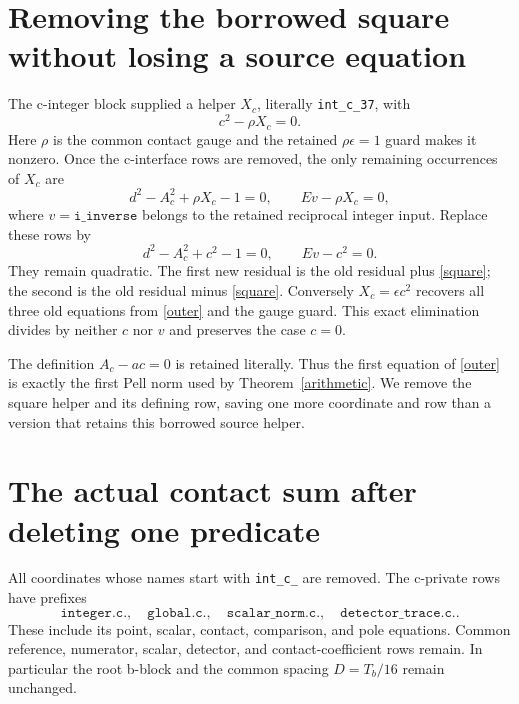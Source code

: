 \documentclass[11pt]{article}
\begin{document}
\section{Removing the borrowed square without losing a source equation}

The c-integer block supplied a helper $X_c$, literally
\texttt{int\_c\_37}, with
\begin{equation}\label{square}
                             c^2-\rho X_c=0.
\end{equation}
Here $\rho$ is the common contact gauge and the retained
$\rho\epsilon=1$ guard makes it nonzero. Once the c-interface
rows are removed, the only remaining occurrences of $X_c$ are
\[
 d^2-A_c^2+\rho X_c-1=0,\qquad Ev-\rho X_c=0,
\]
where $v=\texttt{i\_inverse}$ belongs to the retained reciprocal
integer input. Replace these rows by
\begin{equation}\label{outer}
                 d^2-A_c^2+c^2-1=0,\qquad Ev-c^2=0.
\end{equation}
They remain quadratic. The first new residual is the old
residual plus \eqref{square}; the second is the old residual
minus \eqref{square}. Conversely $X_c=\epsilon c^2$ recovers
all three old equations from \eqref{outer} and the gauge guard.
This exact elimination divides by neither $c$ nor $v$ and
preserves the case $c=0$.

The definition $A_c-ac=0$ is retained literally. Thus the first
equation of \eqref{outer} is exactly the first Pell norm used by
Theorem~\ref{arithmetic}. We remove the square helper and its
defining row, saving one more coordinate and row than a version
that retains this borrowed source helper.

\section{The actual contact sum after deleting one predicate}

All coordinates whose names start with \texttt{int\_c\_} are
removed. The c-private rows have prefixes
\[
 \texttt{integer.c.},\quad \texttt{global.c.},\quad
 \texttt{scalar\_norm.c.},\quad \texttt{detector\_trace.c.}.
\]
These include its point, scalar, contact, comparison, and pole
equations. Common reference, numerator, scalar, detector, and
contact-coefficient rows remain. In particular the root b-block
and the common spacing $D=T_b/16$ remain unchanged.
\end{document}
